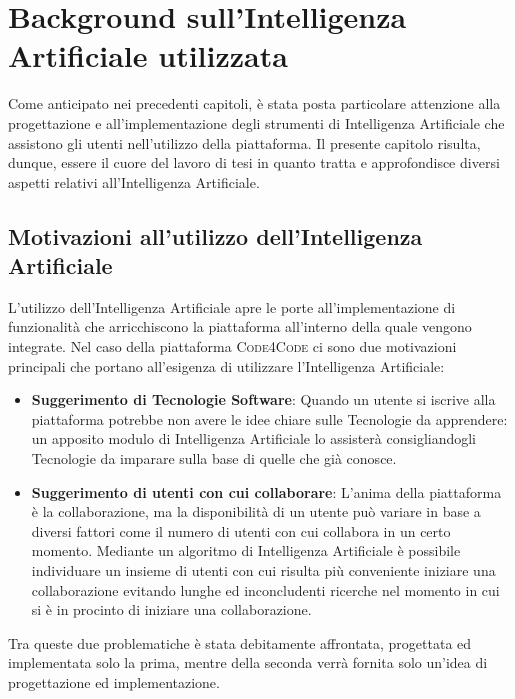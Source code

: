 \chapter{Background sull'Intelligenza Artificiale utilizzata} %
%

\begin{citazione}
Come anticipato nei precedenti capitoli, è stata posta particolare attenzione alla progettazione e all'implementazione degli strumenti di Intelligenza Artificiale che assistono gli utenti nell'utilizzo della piattaforma. Il presente capitolo risulta, dunque, essere il cuore del lavoro di tesi in quanto tratta e approfondisce diversi aspetti relativi all'Intelligenza Artificiale. 
\end{citazione}
\newpage

\section{Motivazioni all'utilizzo dell'Intelligenza Artificiale} %
L'utilizzo dell'Intelligenza Artificiale apre le porte all'implementazione di funzionalità che arricchiscono la piattaforma all'interno della quale vengono integrate. Nel caso della piattaforma \textsc{Code4Code} ci sono due motivazioni principali che portano all'esigenza di utilizzare l'Intelligenza Artificiale:
\begin{itemize}
    \item{\textbf{Suggerimento di Tecnologie Software}: Quando un utente si iscrive alla piattaforma potrebbe non avere le idee chiare sulle Tecnologie da apprendere: un apposito modulo di Intelligenza Artificiale lo assisterà consigliandogli Tecnologie da imparare sulla base di quelle che già conosce.}
    \item{\textbf{Suggerimento di utenti con cui collaborare}: L'anima della piattaforma è la collaborazione, ma la disponibilità di un utente può variare in base a diversi fattori come il numero di utenti con cui collabora in un certo momento. Mediante un algoritmo di Intelligenza Artificiale è possibile individuare un insieme di utenti con cui risulta più conveniente iniziare una collaborazione evitando lunghe ed inconcludenti ricerche nel momento in cui si è in procinto di iniziare una collaborazione.}
\end{itemize}
Tra queste due problematiche è stata debitamente affrontata, progettata ed implementata solo la prima, mentre della seconda verrà fornita solo un'idea di progettazione ed implementazione.
